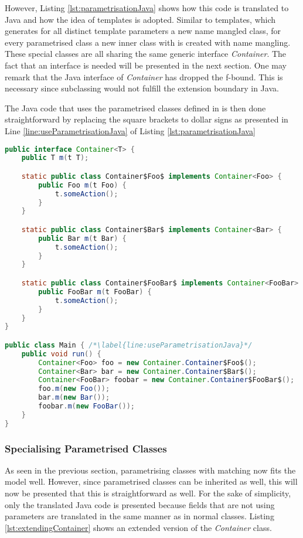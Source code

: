 However, Listing \ref{lst:parametrisationJava} shows
how this code is translated to Java and how the idea of templates is
adopted. Similar to \cpp templates, which generates for all distinct
template parameters a new name mangled class, for every parametrised
class a new inner class with is created with name mangling.
These special classes are all sharing the same generic
interface \emph{Container}. The fact that an interface is needed will be
presented in the next section. One may remark that the Java interface
of \emph{Container} has dropped the f-bound. This is necessary since
subclassing would not fulfill the extension boundary in Java.

The Java code that uses the parametrised classes defined in \ooplss is
then done straightforward by replacing the square brackets to dollar
signs as presented in Line \ref{line:useParametrisationJava} of Listing
\ref{lst:parametrisationJava}

\begin{lstlisting}[language=java,caption=Container class translated to Java.,label=lst:parametrisationJava]
public interface Container<T> {
	public T m(t T);

	static public class Container$Foo$ implements Container<Foo> {
		public Foo m(t Foo) {
			t.someAction();
		}
	}

	static public class Container$Bar$ implements Container<Bar> {
		public Bar m(t Bar) {
			t.someAction();
		}
	}

	static public class Container$FooBar$ implements Container<FooBar> {
		public FooBar m(t FooBar) {
			t.someAction();
		}
	}
}

public class Main { /*\label{line:useParametrisationJava}*/
	public void run() {
		Container<Foo> foo = new Container.Container$Foo$();
		Container<Bar> bar = new Container.Container$Bar$();
		Container<FooBar> foobar = new Container.Container$FooBar$();
		foo.m(new Foo());
		bar.m(new Bar());
		foobar.m(new FooBar());
	}
}
\end{lstlisting}

\subsubsection{Specialising Parametrised Classes}
As seen in the previous section, parametrising classes with matching
now fits the model well. However, since parametrised classes
can be inherited as well, this will now be presented that this
is straightforward as well. For the sake of simplicity, only the
translated Java code is presented because fields that are not using
parameters are translated in the same manner as in normal classes.
Listing \ref{lst:extendingContainer} shows an extended version of the
\emph{Container} class.

